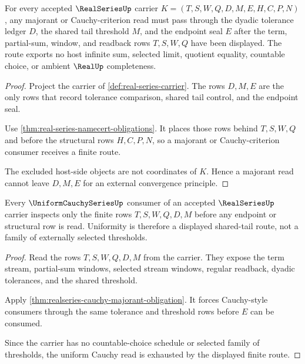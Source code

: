 \begin{theorem}
\label{thm:realseries-cauchy-majorant-obligation}
For every accepted $\RealSeriesUp$ carrier $K=(T,S,W,Q,D,M,E,H,C,P,N)$, any majorant or Cauchy-criterion read must pass through the dyadic tolerance ledger $D$, the shared tail threshold $M$, and the endpoint seal $E$ after the term, partial-sum, window, and readback rows $T,S,W,Q$ have been displayed. The route exports no host infinite sum, selected limit, quotient equality, countable choice, or ambient $\RealUp$ completeness.
\end{theorem}
\begin{proof}
Project the carrier of \autoref{def:real-series-carrier}. The rows $D,M,E$ are the only rows that record tolerance comparison, shared tail control, and the endpoint seal.

Use \autoref{thm:real-series-namecert-obligations}. It places those rows behind $T,S,W,Q$ and before the structural rows $H,C,P,N$, so a majorant or Cauchy-criterion consumer receives a finite route.

The excluded host-side objects are not coordinates of $K$. Hence a majorant read cannot leave $D,M,E$ for an external convergence principle.
\end{proof}

\begin{theorem}
\label{thm:realseries-uniform-cauchy-obligation}
Every $\UniformCauchySeriesUp$ consumer of an accepted $\RealSeriesUp$ carrier inspects only the finite rows $T,S,W,Q,D,M$ before any endpoint or structural row is read. Uniformity is therefore a displayed shared-tail route, not a family of externally selected thresholds.
\end{theorem}
\begin{proof}
Read the rows $T,S,W,Q,D,M$ from the carrier. They expose the term stream, partial-sum windows, selected stream windows, regular readback, dyadic tolerances, and the shared threshold.

Apply \autoref{thm:realseries-cauchy-majorant-obligation}. It forces Cauchy-style consumers through the same tolerance and threshold rows before $E$ can be consumed.

Since the carrier has no countable-choice schedule or selected family of thresholds, the uniform Cauchy read is exhausted by the displayed finite route.
\end{proof}

